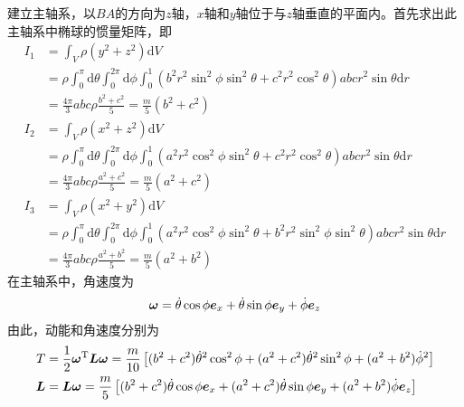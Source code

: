 \begin{solution}
建立主轴系，以$BA$的方向为$z$轴，$x$轴和$y$轴位于与$z$轴垂直的平面内。首先求出此主轴系中椭球的惯量矩阵，即
\begin{align*}
	I_1 & = \int_V \rho (y^2+z^2) \mathrm{d} V \\
	& = \rho \int_0^\pi \mathrm{d} \theta \int_0^{2\pi} \mathrm{d} \phi \int_0^1 (b^2r^2\sin^2 \phi \sin^2 \theta + c^2r^2 \cos^2 \theta) abc r^2 \sin \theta \mathrm{d} r \\
	& = \frac{4\pi}{3} abc \rho \frac{b^2+c^2}{5} = \frac{m}{5} (b^2+c^2) \\
	I_2 & = \int_V \rho (x^2+z^2) \mathrm{d} V \\
	& = \rho \int_0^\pi \mathrm{d} \theta \int_0^{2\pi} \mathrm{d} \phi \int_0^1 (a^2r^2\cos^2 \phi \sin^2 \theta + c^2r^2 \cos^2 \theta) abc r^2 \sin \theta \mathrm{d} r \\
	& = \frac{4\pi}{3} abc \rho \frac{a^2+c^2}{5} = \frac{m}{5} (a^2+c^2) \\
	I_3 & = \int_V \rho (x^2+y^2) \mathrm{d} V \\
	& = \rho \int_0^\pi \mathrm{d} \theta \int_0^{2\pi} \mathrm{d} \phi \int_0^1 (a^2r^2\cos^2 \phi \sin^2 \theta + b^2r^2 \sin^2 \phi \sin^2 \theta) abc r^2 \sin \theta \mathrm{d} r \\
	& = \frac{4\pi}{3} abc \rho \frac{a^2+b^2}{5} = \frac{m}{5} (a^2+b^2)
\end{align*}
在主轴系中，角速度为
\begin{equation*}
	\boldsymbol{\omega} = \dot{\theta} \cos \phi \boldsymbol{e}_x + \dot{\theta} \sin \phi \boldsymbol{e}_y + \dot{\phi} \boldsymbol{e}_z 
\end{equation*}
由此，动能和角速度分别为
\begin{align*}
	T & = \frac12 \boldsymbol{\omega}^{\mathrm{T}} \boldsymbol{L} \boldsymbol{\omega} = \frac{m}{10} \left[(b^2+c^2) \dot{\theta}^2 \cos^2 \phi + (a^2+c^2) \dot{\theta}^2 \sin^2 \phi + (a^2+b^2) \dot{\phi}^2\right] \\
	\boldsymbol{L} & = \boldsymbol{L} \boldsymbol{\omega} = \frac{m}{5} \left[(b^2+c^2) \dot{\theta} \cos \phi \boldsymbol{e}_x + (a^2+c^2) \dot{\theta} \sin \phi \boldsymbol{e}_y + (a^2+b^2) \dot{\phi} \boldsymbol{e}_z \right]
\end{align*}
\end{solution}

\iffalse
\begin{question}[148页4.29]
对称Lagrange陀螺的轴位于铅直位置，陀螺以很大的角速度$\omega$作稳定的自转。今突然在离定点$d$处作用一与陀螺的垂直轴垂直的冲量$p$。证明在陀螺此后的运动中，最大章动角近似为$2\arctan \dfrac{pd}{I_3 \omega}$。
\end{question}
\begin{solution}

\end{solution}

作业：p146-149，4.29（Lagrange陀螺），4.31

\subsection{非惯性系}\fi
